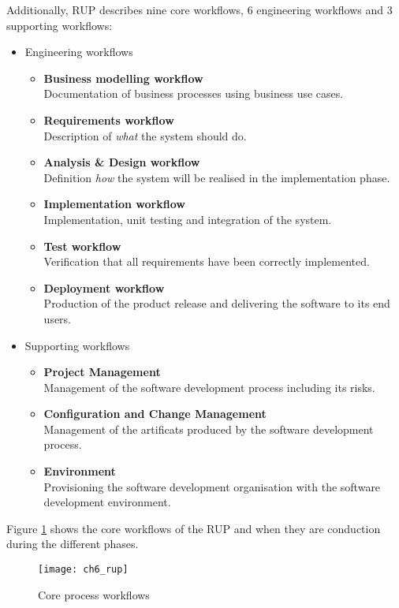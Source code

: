 Additionally, \ac{RUP} describes nine core workflows, 6 engineering workflows and 3 supporting workflows:

\begin{itemize}
	\item Engineering workflows
	\begin{itemize}
		\item \textbf{Business modelling workflow}\\
		Documentation of business processes using business use cases.
		\item \textbf{Requirements workflow}\\
		Description of \emph{what} the system should do.
		\item \textbf{Analysis \& Design workflow}\\
		Definition \emph{how} the system  will be realised in the implementation phase.
		\item \textbf{Implementation workflow}\\
		Implementation, unit testing and integration of the system.
		\item \textbf{Test workflow}\\
		Verification that all requirements have been correctly implemented.
		\item \textbf{Deployment workflow}\\
		Production of the product release and delivering the software to its end users.
	\end{itemize}
	\item Supporting workflows
	\begin{itemize}
		\item \textbf{Project Management}\\
		Management of the software development process including its risks.
		\item \textbf{Configuration and Change Management}\\
		Management of the artificats produced by the software development process.
		\item \textbf{Environment}\\
		Provisioning the software development organisation with the software development environment.
	\end{itemize}
\end{itemize}

Figure \ref{fig:ch6_rup} shows the core workflows of the \ac{RUP} and when they are conduction during the different phases.

\begin{figure}[htpb] \centering 
	\texttt{[image: ch6\_rup]} 
	\caption{Core process workflows \citep{Kruchten:1996aa}} 
	\label{fig:ch6_rup} 
\end{figure}

